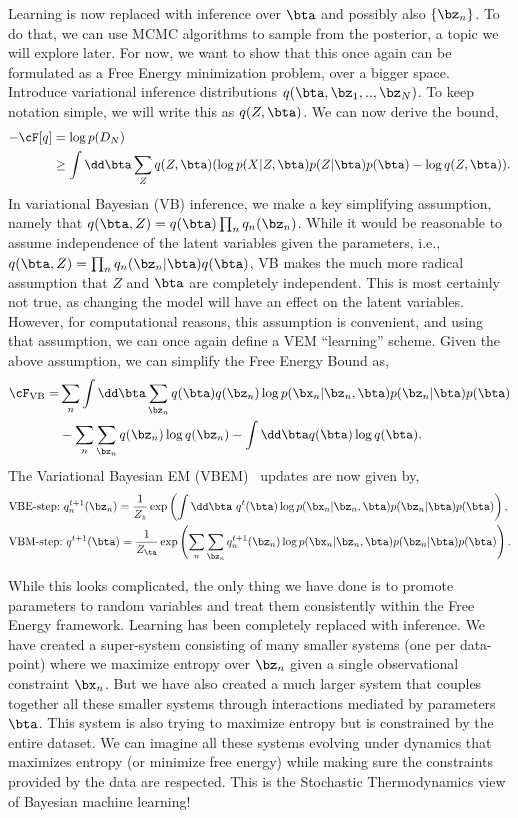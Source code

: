 \documentclass{lecture}
\begin{document}
Learning is now replaced with inference over $\bta$ and possibly also $\{\bz_n\}$. To do that, we can use MCMC algorithms to sample from the posterior, a topic we will explore later. For now, we want to show that this once again can be formulated as a Free Energy minimization problem, over a bigger space. Introduce variational inference distributions $q(\bta,\bz_1,..,\bz_N)$. To keep notation simple, we will write this as $q(Z,\bta)$. We can now derive the bound,
\begin{align}
	-\cF[q] &= \log p(D_N)\\
	        &\geq \int\dd\bta \sum_Z q(Z,\bta) (\log p(X|Z,\bta)p(Z|\bta)p(\bta) - \log q(Z,\bta)).
\end{align}
In variational Bayesian (VB) inference, we make a key simplifying assumption, namely that $q(\bta,Z)=q(\bta)\prod_n q_n(\bz_n)$. While it would be reasonable to assume independence of the latent variables given the parameters, i.e., $q(\bta,Z) = \prod_n q_n(\bz_n|\bta)q(\bta)$, VB makes the much more radical assumption that $Z$ and $\bta$ are completely independent. This is most certainly not true, as changing the model will have an effect on the latent variables. However, for computational reasons, this assumption is convenient, and using that assumption, we can once again define a VEM ``learning'' scheme.
Given the above assumption, we can simplify the Free Energy Bound as,
\begin{align}
	\cF_\text{VB} = &\sum_n \int\dd\bta \sum_{\bz_n} q(\bta) q(\bz_n)\log p(\bx_n|\bz_n,\bta)p(\bz_n|\bta)p(\bta)\\
	                &-\sum_n \sum_{\bz_n}q(\bz_n)\log q(\bz_n)  - \int\dd\bta q(\bta)\log q(\bta).
\end{align}
The Variational Bayesian EM (VBEM)~\cite{Beal2003Variational} updates are now given by,
\begin{align}
	 &\text{VBE-step:}~ q_{n}^{t+1}(\bz_n) = \frac{1}{Z_z} \exp\left(\int\dd\bta ~q^t(\bta)\log p(\bx_n|\bz_n,\bta)p(\bz_n|\bta)p(\bta) \right),\\
	 &\text{VBM-step:}~ q^{t+1}(\bta) = \frac{1}{Z_\ta} \exp\left(\sum_{n}\sum_{\bz_n} q_n^{t+1}(\bz_n)\log p(\bx_n|\bz_n,\bta)p(\bz_n|\bta)p(\bta) \right).
\end{align}

While this looks complicated, the only thing we have done is to promote parameters to random variables and treat them consistently within the Free Energy framework. Learning has been completely replaced with inference. We have created a super-system consisting of many smaller systems (one per data-point) where we maximize entropy over $\bz_n$ given a single observational constraint $\bx_n$. But we have also created a much larger system that couples together all these smaller systems through interactions mediated by parameters $\bta$. This system is also trying to maximize entropy but is constrained by the entire dataset. We can imagine all these systems evolving under dynamics that maximizes entropy (or minimize free energy) while making sure the constraints provided by the data are respected. This is the Stochastic Thermodynamics view of Bayesian machine learning!
\end{document}
